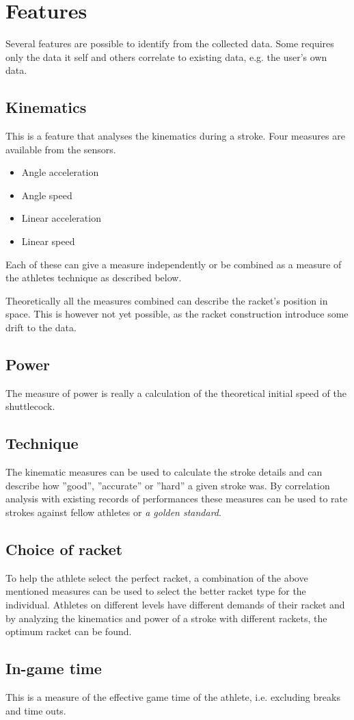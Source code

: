 
\section{Features}
Several features are possible to identify from the collected data.
Some requires only the data it self and others correlate to existing data, e.g. the user's own data.

\subsection*{Kinematics}
This is a feature that analyses the kinematics during a stroke.
Four measures are available from the sensors.

\begin{itemize}
    \item Angle acceleration
    \item Angle speed
    \item Linear acceleration
    \item Linear speed
\end{itemize}

Each of these can give a measure independently or be combined as a measure of the athletes technique as described below.

Theoretically all the measures combined can describe the racket's position in space. 
This is however not yet possible, as the racket construction introduce some drift to the data.

\subsection*{Power}
The measure of power is really a calculation of the theoretical initial speed of the shuttlecock.

\subsection*{Technique}
The kinematic measures can be used to calculate the stroke details and can describe how ''good'', ''accurate'' or ''hard'' a given stroke was.
By correlation analysis with existing records of performances these measures can be used to rate strokes against fellow athletes or \textit{a golden standard}.

\subsection*{Choice of racket}
To help the athlete select the perfect racket, a combination of the above mentioned measures can be used to select the better racket type for the individual.
Athletes on different levels have different demands of their racket and by analyzing the kinematics and power of a stroke with different rackets, the optimum racket can be found.

\subsection*{In-game time}
This is a measure of the effective game time of the athlete, i.e. excluding breaks and time outs.
